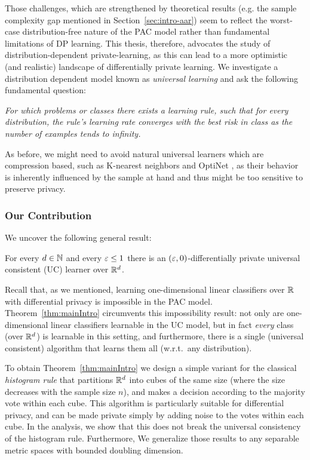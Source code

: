 \documentclass[12pt,a4paper,oneside,onecolumn]{book}
\begin{document}
Those challenges, which are strengthened by theoretical results (e.g. the sample complexity gap mentioned in Section~\ref{sec:intro-aar})  
%
%
seem to reflect the worst-case distribution-free nature of the PAC model rather than fundamental limitations of DP learning. 
This thesis, 
%
%
therefore, advocates the study of distribution-dependent private-learning, as this can lead to a more optimistic (and realistic) landscape of differentially private learning. We investigate a distribution dependent model known as \emph{universal learning} and ask the following fundamental question:
\begin{question}{\em
For which problems or classes there exists a learning rule, such that for every distribution, the rule's learning rate converges with the best risk in class as the number of examples tends to infinity.}
\end{question}
%
%

As before, we might need to avoid natural universal learners which are compression based, such as K-nearest neighbors \citet{devroye2013probabilistic} and OptiNet \citep{DBLP:journals/corr/abs-1906-09855}, as their behavior is inherently influenced by the sample at hand and thus might be too sensitive to preserve privacy.
%
%

\subsubsection{Our Contribution}

We uncover the following general result:

\begin{theorem}\label{thm:mainIntro}
For every $d\in\mathbb{N}$ and every $\varepsilon\leq1$ there is an $(\varepsilon,0)$-differentially private universal consistent (UC) learner over $\mathbb{R}^d$.
\end{theorem}

Recall that, as we mentioned, learning one-dimensional linear classifiers over $\mathbb{R}$ with differential privacy is impossible in the PAC model. Theorem~\ref{thm:mainIntro} circumvents this impossibility result: not only are one-dimensional linear classifiers learnable in the UC model, but in fact {\em every} class (over $\mathbb{R}^d$) is learnable in this setting, and furthermore, there is a single (universal consistent) algorithm that learns them all (w.r.t.\ any distribution).

To obtain Theorem~\ref{thm:mainIntro} we design a simple variant for the classical {\em histogram rule} \citep{Glick73,GordonO78,GordonO80,devroye2013probabilistic} that partitions $\mathbb{R}^d$ into cubes of the same size (where the size decreases with the sample size $n$), and makes a decision according to the majority vote within each cube. This algorithm is particularly suitable for differential privacy, and can be made private simply by adding noise to the votes within each cube. In the analysis, we show that this does not break the universal consistency of the histogram rule.
Furthermore, We generalize those results to any separable metric spaces with bounded doubling dimension.
\end{document}
